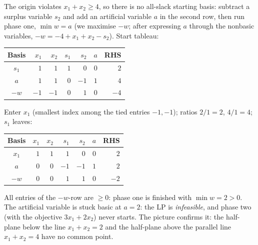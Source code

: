 \begin{solutions}
  \item The origin violates $x_1+x_2\ge 4$, so there is no all-slack
        starting basis: subtract a surplus variable $s_2$ and add an
        artificial variable $a$ in the second row, then run phase one,
        $\min w=a$ (we maximise $-w$; after expressing $a$ through the
        nonbasic variables, $-w=-4+x_1+x_2-s_2$). Start tableau:
        \begin{center}
        \begin{tabular}{c|rrrrr|r}
        \hline
        Basis & $x_1$ & $x_2$ & $s_1$ & $s_2$ & $a$ & RHS\\
        \hline
        $s_1$ & $1$ & $1$ & $1$ & $0$ & $0$ & $2$\\
        $a$   & $1$ & $1$ & $0$ & $-1$ & $1$ & $4$\\
        \hline
        $-w$ & $-1$ & $-1$ & $0$ & $1$ & $0$ & $-4$\\
        \hline
        \end{tabular}
        \end{center}
        Enter $x_1$ (smallest index among the tied entries $-1,-1$);
        ratios $2/1=2$, $4/1=4$; $s_1$ leaves:
        \begin{center}
        \begin{tabular}{c|rrrrr|r}
        \hline
        Basis & $x_1$ & $x_2$ & $s_1$ & $s_2$ & $a$ & RHS\\
        \hline
        $x_1$ & $1$ & $1$ & $1$ & $0$ & $0$ & $2$\\
        $a$   & $0$ & $0$ & $-1$ & $-1$ & $1$ & $2$\\
        \hline
        $-w$ & $0$ & $0$ & $1$ & $1$ & $0$ & $-2$\\
        \hline
        \end{tabular}
        \end{center}
        All entries of the $-w$-row are $\ge 0$: phase one is finished with
        $\min w=2>0$. The artificial variable is stuck basic at $a=2$:
        the LP is \emph{infeasible}, and phase two (with the objective
        $3x_1+2x_2$) never starts. The picture confirms it: the half-plane
        below the line $x_1+x_2=2$ and the half-plane above the parallel
        line $x_1+x_2=4$ have no common point.


\end{solutions}
